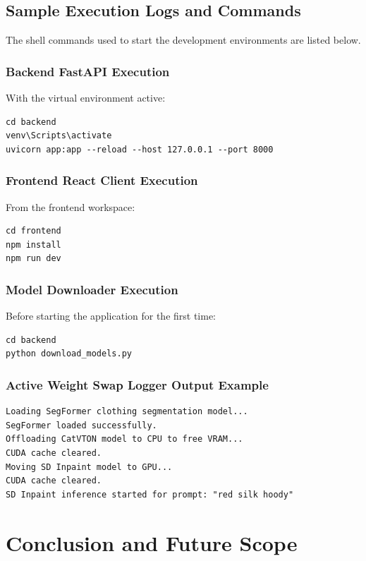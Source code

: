 \documentclass[12pt, a4paper]{report}
\begin{document}
\section{Sample Execution Logs and Commands}

The shell commands used to start the development environments are listed below.

\subsection{Backend FastAPI Execution}
With the virtual environment active:
\begin{verbatim}
cd backend
venv\Scripts\activate
uvicorn app:app --reload --host 127.0.0.1 --port 8000
\end{verbatim}

\subsection{Frontend React Client Execution}
From the frontend workspace:
\begin{verbatim}
cd frontend
npm install
npm run dev
\end{verbatim}

\subsection{Model Downloader Execution}
Before starting the application for the first time:
\begin{verbatim}
cd backend
python download_models.py
\end{verbatim}

\subsection{Active Weight Swap Logger Output Example}
\begin{verbatim}
Loading SegFormer clothing segmentation model...
SegFormer loaded successfully.
Offloading CatVTON model to CPU to free VRAM...
CUDA cache cleared.
Moving SD Inpaint model to GPU...
CUDA cache cleared.
SD Inpaint inference started for prompt: "red silk hoody"
\end{verbatim}

\chapter{Conclusion and Future Scope}
\end{document}
